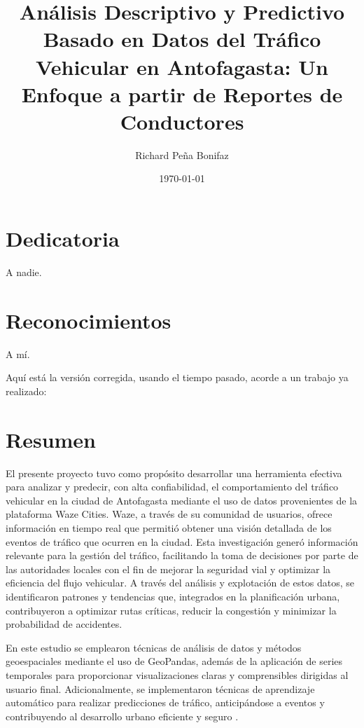 \documentclass[12pt]{article}
\begin{document}
\title{Análisis Descriptivo y Predictivo Basado en Datos del Tráfico Vehicular en Antofagasta: Un Enfoque a partir de Reportes de Conductores}
\author{Richard Peña Bonifaz}
\date{\today}
\maketitle

\section*{Dedicatoria}
A nadie.
\section*{Reconocimientos}
A mí.

Aquí está la versión corregida, usando el tiempo pasado, acorde a un trabajo ya realizado:

\section*{Resumen}

El presente proyecto tuvo como propósito desarrollar una herramienta efectiva para analizar y predecir, con alta confiabilidad, el comportamiento del tráfico vehicular en la ciudad de Antofagasta mediante el uso de datos provenientes de la plataforma Waze Cities. Waze, a través de su comunidad de usuarios, ofrece información en tiempo real que permitió obtener una visión detallada de los eventos de tráfico que ocurren en la ciudad. Esta investigación generó información relevante para la gestión del tráfico, facilitando la toma de decisiones por parte de las autoridades locales con el fin de mejorar la seguridad vial y optimizar la eficiencia del flujo vehicular. A través del análisis y explotación de estos datos, se identificaron patrones y tendencias que, integrados en la planificación urbana, contribuyeron a optimizar rutas críticas, reducir la congestión y minimizar la probabilidad de accidentes.

En este estudio se emplearon técnicas de análisis de datos y métodos geoespaciales mediante el uso de GeoPandas, además de la aplicación de series temporales para proporcionar visualizaciones claras y comprensibles dirigidas al usuario final. Adicionalmente, se implementaron técnicas de aprendizaje automático para realizar predicciones de tráfico, anticipándose a eventos y contribuyendo al desarrollo urbano eficiente y seguro \parencite{barcelo2005}.
\end{document}
